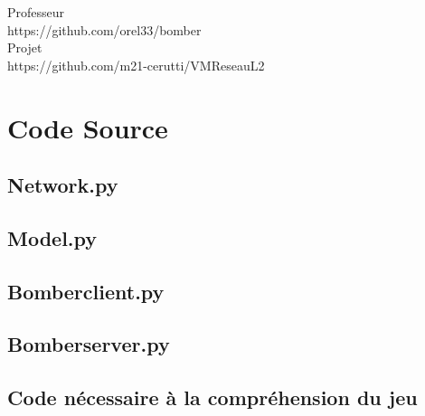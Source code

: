 \documentclass[a4paper]{article}
\begin{document}
Professeur
\\
https://github.com/orel33/bomber
\\

Projet
\\
https://github.com/m21-cerutti/VM\textunderscore Reseau\textunderscore L2
\\

\newpage
\section{Code Source}

\subsection{Network.py} \label{network.py}
\newpage

\subsection{Model.py} \label{model.py}

\newpage

\subsection{Bomber\textunderscore client.py} \label{bomber_client.py}

\newpage

\subsection{Bomber\textunderscore server.py} \label{bomber_server.py}

\newpage

\subsection{Code nécessaire à la compréhension du jeu}

\newpage

\end{document}
